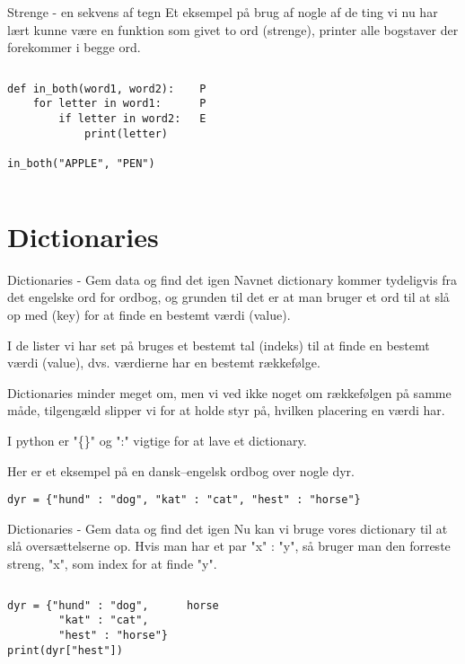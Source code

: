 \documentclass[main.tex]{subfiles}
\begin{document}
\begin{frame}[fragile]{Strenge - en sekvens af tegn}
	Et eksempel på brug af nogle af de ting vi nu har lært kunne være en funktion som givet to ord (strenge), printer alle bogstaver der forekommer i begge ord.
	\begin{columns}
		\begin{lstlisting}[style=python]
def in_both(word1, word2):
    for letter in word1:
        if letter in word2:
            print(letter)
            
in_both("APPLE", "PEN")
		\end{lstlisting}

		\pause
		\begin{lstlisting}[style=python]
P
P
E
		\end{lstlisting}
	\end{columns}
\end{frame}

\section{Dictionaries}

\begin{frame}[fragile]{Dictionaries - Gem data og find det igen}
	Navnet dictionary kommer tydeligvis fra det engelske ord for ordbog, og grunden til det er at man bruger et ord til at slå op med (key) for at finde en bestemt værdi (value). 
	
	I de lister vi har set på bruges et bestemt tal (indeks) til at finde en bestemt værdi (value), dvs. værdierne har en bestemt rækkefølge.
	
	Dictionaries minder meget om, men vi ved ikke noget om rækkefølgen på samme måde, tilgengæld slipper vi for at holde styr på, hvilken placering en værdi har.
	
	I python er "\{\}" og ":" vigtige for at lave et dictionary.
	\pause
	
	Her er et eksempel på en dansk--engelsk ordbog over nogle dyr.
	\begin{lstlisting}[style=python]
dyr = {"hund" : "dog", "kat" : "cat", "hest" : "horse"}
	\end{lstlisting}
\end{frame}

\begin{frame}[fragile]{Dictionaries - Gem data og find det igen}
	Nu kan vi bruge vores dictionary til at slå oversættelserne op. Hvis man har et par "x" : "y", så bruger man den forreste streng, "x", som index for at finde "y".
	\begin{columns}
		\column{0.4\textwidth}
		\begin{lstlisting}[style=python]
dyr = {"hund" : "dog", 
        "kat" : "cat", 
        "hest" : "horse"}
print(dyr["hest"])
		\end{lstlisting}
	
		\pause
		\column{0.4\textwidth}
		\begin{lstlisting}[style=python]
horse
		\end{lstlisting}
	\end{columns}	
\end{frame}
\end{document}
